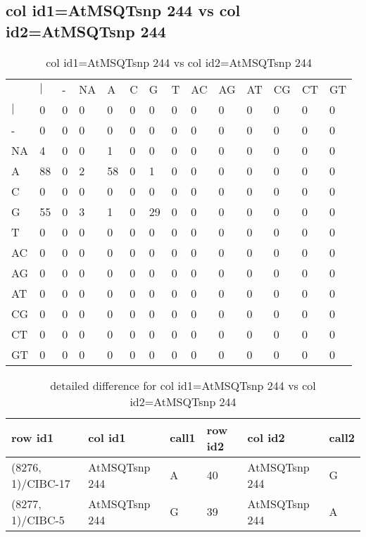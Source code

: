 \subsection{col id1=AtMSQTsnp 244 vs col id2=AtMSQTsnp 244}
\begin{center}
\begin{longtable}{|l|l|l|l|l|l|l|l|l|l|l|l|l|l|}
\caption{col id1=AtMSQTsnp 244 vs col id2=AtMSQTsnp 244} \label{table_dm598}\\
\hline
\\
\hline
&$|$&-&NA&A&C&G&T&AC&AG&AT&CG&CT&GT\\
$|$&0&0&0&0&0&0&0&0&0&0&0&0&0\\
-&0&0&0&0&0&0&0&0&0&0&0&0&0\\
NA&4&0&0&1&0&0&0&0&0&0&0&0&0\\
A&88&0&2&58&0&1&0&0&0&0&0&0&0\\
C&0&0&0&0&0&0&0&0&0&0&0&0&0\\
G&55&0&3&1&0&29&0&0&0&0&0&0&0\\
T&0&0&0&0&0&0&0&0&0&0&0&0&0\\
AC&0&0&0&0&0&0&0&0&0&0&0&0&0\\
AG&0&0&0&0&0&0&0&0&0&0&0&0&0\\
AT&0&0&0&0&0&0&0&0&0&0&0&0&0\\
CG&0&0&0&0&0&0&0&0&0&0&0&0&0\\
CT&0&0&0&0&0&0&0&0&0&0&0&0&0\\
GT&0&0&0&0&0&0&0&0&0&0&0&0&0\\
\hline
\end{longtable}
\end{center}

\begin{center}
\begin{longtable}{|l|l|l|l|l|l|}
\caption{detailed difference for col id1=AtMSQTsnp 244 vs col id2=AtMSQTsnp 244} \label{table_dm599}\\
\hline
row id1&col id1&call1&row id2&col id2&call2\\
\hline
(8276, 1)/CIBC-17&AtMSQTsnp 244&A&40&AtMSQTsnp 244&G\\
(8277, 1)/CIBC-5&AtMSQTsnp 244&G&39&AtMSQTsnp 244&A\\
\hline
\end{longtable}
\end{center}

